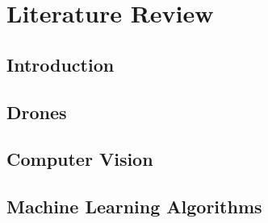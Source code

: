 \chapter{Literature Review}

\section{Introduction}

\section{Drones}

\section{Computer Vision}

\section{Machine Learning Algorithms}
